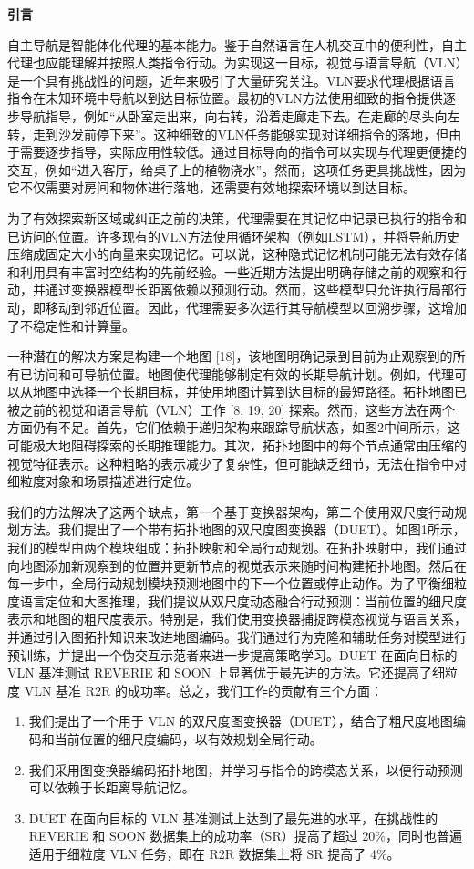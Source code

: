 \documentclass[bachelor]{thesis-uestc}
\begin{document}
\textbf{引言}

自主导航是智能体化代理的基本能力。鉴于自然语言在人机交互中的便利性，自主代理也应能理解并按照人类指令行动。为实现这一目标，视觉与语言导航（VLN）是一个具有挑战性的问题，近年来吸引了大量研究关注。VLN要求代理根据语言指令在未知环境中导航以到达目标位置。最初的VLN方法使用细致的指令提供逐步导航指导，例如“从卧室走出来，向右转，沿着走廊走下去。在走廊的尽头向左转，走到沙发前停下来”。这种细致的VLN任务能够实现对详细指令的落地，但由于需要逐步指导，实际应用性较低。通过目标导向的指令可以实现与代理更便捷的交互，例如“进入客厅，给桌子上的植物浇水”。然而，这项任务更具挑战性，因为它不仅需要对房间和物体进行落地，还需要有效地探索环境以到达目标。

为了有效探索新区域或纠正之前的决策，代理需要在其记忆中记录已执行的指令和已访问的位置。许多现有的VLN方法使用循环架构（例如LSTM），并将导航历史压缩成固定大小的向量来实现记忆。可以说，这种隐式记忆机制可能无法有效存储和利用具有丰富时空结构的先前经验。一些近期方法提出明确存储之前的观察和行动，并通过变换器模型长距离依赖以预测行动。然而，这些模型只允许执行局部行动，即移动到邻近位置。因此，代理需要多次运行其导航模型以回溯步骤，这增加了不稳定性和计算量。

一种潜在的解决方案是构建一个地图 [18]，该地图明确记录到目前为止观察到的所有已访问和可导航位置。地图使代理能够制定有效的长期导航计划。例如，代理可以从地图中选择一个长期目标，并使用地图计算到达目标的最短路径。拓扑地图已被之前的视觉和语言导航（VLN）工作 [8, 19, 20] 探索。然而，这些方法在两个方面仍有不足。首先，它们依赖于递归架构来跟踪导航状态，如图2中间所示，这可能极大地阻碍探索的长期推理能力。其次，拓扑地图中的每个节点通常由压缩的视觉特征表示。这种粗略的表示减少了复杂性，但可能缺乏细节，无法在指令中对细粒度对象和场景描述进行定位。

我们的方法解决了这两个缺点，第一个基于变换器架构，第二个使用双尺度行动规划方法。我们提出了一个带有拓扑地图的双尺度图变换器（DUET）。如图1所示，我们的模型由两个模块组成：拓扑映射和全局行动规划。在拓扑映射中，我们通过向地图添加新观察到的位置并更新节点的视觉表示来随时间构建拓扑地图。然后在每一步中，全局行动规划模块预测地图中的下一个位置或停止动作。为了平衡细粒度语言定位和大图推理，我们提议从双尺度动态融合行动预测：当前位置的细尺度表示和地图的粗尺度表示。特别是，我们使用变换器捕捉跨模态视觉与语言关系，并通过引入图拓扑知识来改进地图编码。我们通过行为克隆和辅助任务对模型进行预训练，并提出一个伪交互示范者来进一步提高策略学习。DUET 在面向目标的 VLN 基准测试 REVERIE 和 SOON 上显著优于最先进的方法。它还提高了细粒度 VLN 基准 R2R 的成功率。总之，我们工作的贡献有三个方面：
\begin{enumerate}
    \item 我们提出了一个用于 VLN 的双尺度图变换器（DUET），结合了粗尺度地图编码和当前位置的细尺度编码，以有效规划全局行动。
    \item 我们采用图变换器编码拓扑地图，并学习与指令的跨模态关系，以便行动预测可以依赖于长距离导航记忆。
    \item DUET 在面向目标的 VLN 基准测试上达到了最先进的水平，在挑战性的 REVERIE 和 SOON 数据集上的成功率（SR）提高了超过 20\%，同时也普遍适用于细粒度 VLN 任务，即在 R2R 数据集上将 SR 提高了 4\%。
\end{enumerate}
\end{document}
